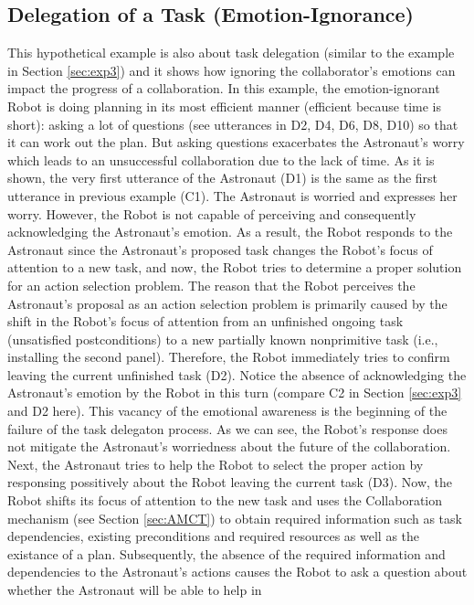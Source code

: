 \subsection{Delegation of a Task (Emotion-Ignorance)}

This hypothetical example is also about task delegation (similar to the example
in Section \ref{sec:exp3}) and it shows how ignoring the collaborator's emotions can
impact the progress of a collaboration. In this example, the emotion-ignorant
Robot is doing planning in its most efficient manner (efficient because time is
short): asking a lot of questions (see utterances in D2, D4, D6, D8, D10) so
that it can work out the plan. But asking questions exacerbates the Astronaut's
worry which leads to an unsuccessful collaboration due to the lack of time.
As it is shown, the very first utterance of the Astronaut (D1) is the same as
the first utterance in previous example (C1). The Astronaut is worried and
expresses her worry. However, the Robot is not capable of perceiving and
consequently acknowledging the Astronaut's emotion. As a result, the Robot
responds to the Astronaut since the Astronaut's proposed task changes the
Robot's focus of attention to a new task, and now, the Robot tries to determine
a proper solution for an action selection problem. The reason that the Robot
perceives the Astronaut's proposal as an action selection problem is primarily
caused by the shift in the Robot's focus of attention from an unfinished
ongoing task (unsatisfied postconditions) to a new partially known nonprimitive
task (i.e., installing the second panel). Therefore, the Robot immediately tries
to confirm leaving the current unfinished task (D2). Notice the absence of
acknowledging the Astronaut's emotion by the Robot in this turn (compare C2 in
Section \ref{sec:exp3} and D2 here). This vacancy of the emotional awareness
is the beginning of the failure of the task delegaton process. As we can see,
the Robot's response does not mitigate the Astronaut's worriedness about the
future of the collaboration. Next, the Astronaut tries to help the Robot to
select the proper action by responsing possitively about the Robot leaving
the current task (D3). Now, the Robot shifts its focus of attention to the new
task and uses the Collaboration mechanism (see Section \ref{sec:AMCT}) to obtain
required information such as task dependencies, existing preconditions and
required resources as well as the existance of a plan. Subsequently, the absence
of the required information and dependencies to the Astronaut's actions causes
the Robot to ask a question about whether the Astronaut will be able to help in

